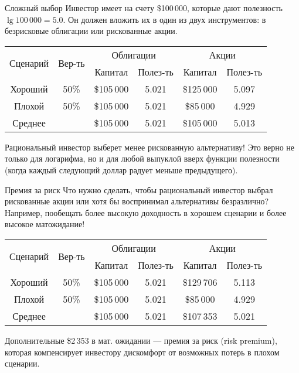 \documentclass{beamer}
\begin{document}
\begin{frame}{Сложный выбор}
\justify
Инвестор имеет на счету \$100\,000, которые дают полезность $\lg 100\,000 = 5.0$. Он должен вложить их в один из двух инструментов: в безрисковые облигации или рискованные акции.

\vspace{\baselineskip}
\begin{tabular}{c|c|c|c|c|c}
\multirow{2}{*}{Сценарий} & \multirow{2}{*}{Вер-ть} & \multicolumn{2}{c|}{Облигации} & \multicolumn{2}{c}{Акции} \\
\cline{3-6}
        &      & Капитал    & Полез-ть & Капитал      & Полез-ть \\ \hline
Хороший & 50\% & \$105\,000 & 5.021    & \$125\,000 & 5.097 \\
Плохой  & 50\% & \$105\,000 & 5.021    & \$85\,000  & 4.929 \\ \hline
Среднее &      & \$105\,000 & \alert{5.021} & \$105\,000 & \alert{5.013}
\end{tabular}

\vspace{\baselineskip}
Рациональный инвестор выберет менее рискованную альтернативу! Это верно не только для логарифма, но и для любой выпуклой вверх функции полезности (когда каждый следующий доллар радует меньше предыдущего).
\end{frame}



\begin{frame}{Премия за риск}
\justify
Что нужно сделать, чтобы рациональный инвестор выбрал рискованные акции или хотя бы воспринимал альтернативы безразлично? Например, пообещать более высокую доходность в хорошем сценарии и более высокое матожидание!

\vspace{\baselineskip}
\begin{tabular}{c|c|c|c|c|c}
\multirow{2}{*}{Сценарий} & \multirow{2}{*}{Вер-ть} & \multicolumn{2}{c|}{Облигации} & \multicolumn{2}{c}{Акции} \\
\cline{3-6}
        &      & Капитал    & Полез-ть & Капитал      & Полез-ть \\ \hline
Хороший & 50\% & \$105\,000 & 5.021    & \alert{\$129\,706} & \alert{5.113} \\
Плохой  & 50\% & \$105\,000 & 5.021    & \$85\,000  & 4.929 \\ \hline
Среднее &      & \$105\,000 & 5.021    & \alert{\$107\,353} & \alert{5.021}
\end{tabular}

\vspace{\baselineskip}
Дополнительные \$2\,353 в мат. ожидании --- премия за риск (risk premium), которая компенсирует инвестору дискомфорт от возможных потерь в плохом сценарии.
\end{frame}
\end{document}
